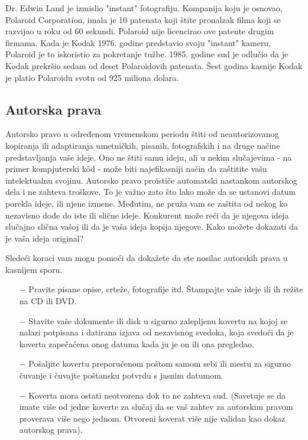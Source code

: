 \documentclass[a4paper]{article}
\begin{document}
Dr. Edwin Land je izmislio "instant" fotografiju. Kompanija koju je osnovao, Polaroid Corporation, imala je 10 patenata koji štite pronalzak filma koji se razvijao u roku od 60 sekundi. Polaroid nije licencirao ove patente drugim firmama. Kada je Kodak 1976. godine predstavio svoju "instant" kameru, Polaroid je to iskoristio za pokretanje tužbe. 1985. godine sud je odlučio da je Kodak prekršio sedam od deset Polaroidovih patenata. Šest godina kasnije Kodak je platio Polaroidu svotu od 925 miliona dolara.

\subsection{Autorska prava}
\label{subsec:autorska}

Autorsko pravo u određenom vremenskom periodu štiti od neautorizovanog kopiranja ili adaptiranja umetničkih, pisanih, fotografskih i na druge načine predstavljanja vaše ideje. Ono ne štiti samu ideju, ali u nekim slučajevima - na primer kompjuterski kôd - može biti najefikasniji način da zaštitite vašu intelektualnu svojinu.
Autorsko pravo proističe automatski nastankom autorskog dela i ne zahteva troškove. To je važno zato što lako može da se ustanovi datum porekla ideje, ili njene izmene. Međutim, ne pruža vam se zaštita od nekog ko nezavisno dođe do iste ili slične ideje. Konkurent može reći da je njegova ideja slučajno slična vašoj ili da je vaša ideja kopija njegove. Kako možete dokazati da je vaša ideja original?

Sledeći koraci vam mogu pomoći da dokažete da ste nosilac autorskih prava u kasnijem sporu.

\begin{itemize}
\item[$-$] Pravite pisane opise, crteže, fotografije itd. Štampajte vaše ideje ili ih režite na CD ili DVD.
\item[$-$] Stavite vaše dokumente ili disk u sigurno zalepljenu kovertu na kojoj se nalazi potpisana i datirana izjava od nezavisnog svedoka, koja svedoči da je koverta zapečaćena onog datuma kada ju je on ili ona pregledao.
\item[$-$] Pošaljite kovertu preporučenom poštom samom sebi ili mestu za sigurno čuvanje i čuvajte poštansku potvrdu s jasnim datumom.
\item[$-$] Koverta mora ostati neotvorena dok to ne zahteva sud. (Savetuje se da imate više od jedne koverte za slučaj da se vaš zahtev za autorskim pravom proverava više nego jednom. Otvoreni koverat više nije validan kao dokaz autorskog prava).
\end{itemize}
\end{document}
